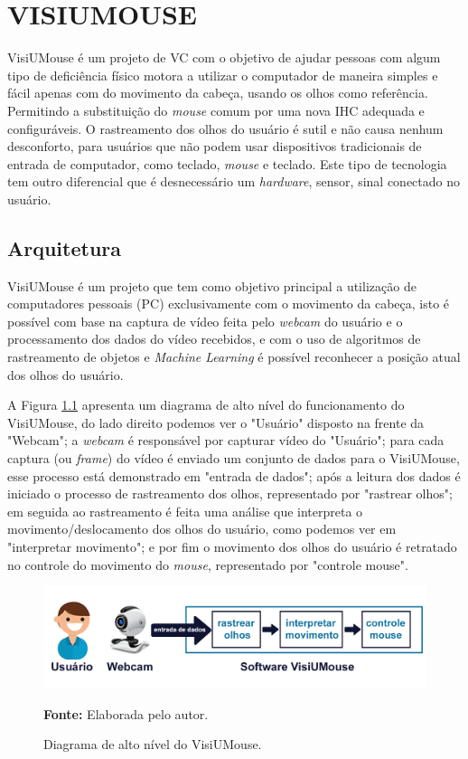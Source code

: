 \chapter{VISIUMOUSE}\label{CAP4}
VisiUMouse é um projeto de VC com o objetivo de ajudar pessoas com algum tipo de deficiência físico motora a utilizar o computador de maneira simples e fácil apenas com do movimento da cabeça, usando os olhos como referência. Permitindo a substituição do \textit{mouse} comum por uma nova IHC adequada e configuráveis. O rastreamento dos olhos do usuário é sutil e não causa nenhum desconforto, para usuários que não podem usar dispositivos tradicionais de entrada de computador, como teclado, \textit{mouse} e teclado. Este tipo de tecnologia tem outro diferencial que é desnecessário um \textit{hardware}, sensor, sinal conectado no usuário.

\section{Arquitetura}\label{Sub:funcionamento-visiumouse}
VisiUMouse é um projeto que tem como objetivo principal a utilização de computadores pessoais (PC) exclusivamente com o movimento da cabeça, isto é possível com base na captura de vídeo feita pelo \textit{webcam} do usuário e o processamento dos dados do vídeo recebidos, e com o uso de algoritmos de rastreamento de objetos e \textit{Machine Learning} é possível reconhecer a posição atual dos olhos do usuário. 

A Figura \ref{fig:projeto-diagrama-alto-nivel} apresenta um diagrama de alto nível do funcionamento do VisiUMouse, do lado direito podemos ver o "Usuário" disposto na frente da "Webcam"; a \textit{webcam} é responsável por capturar vídeo do "Usuário"; para cada captura (ou \textit{frame}) do vídeo é enviado um conjunto de dados para o VisiUMouse, esse processo está demonstrado em "entrada de dados";  após a leitura dos dados é iniciado o processo de rastreamento dos olhos, representado por "rastrear olhos"; em seguida ao rastreamento é feita uma análise que interpreta o movimento/deslocamento dos olhos do usuário, como podemos ver em "interpretar movimento"; e por fim o movimento dos olhos do usuário é retratado no controle do movimento do \textit{mouse}, representado por "controle mouse".

\begin{figure}[htbp]
\centering
\caption{Diagrama de alto nível do VisiUMouse.}
\includegraphics[scale=.25]{img/projeto-diagrama-alto-nivel.png}

{\fontsize{11}{11}\selectfont \textbf{Fonte:} Elaborada pelo autor.}
\label{fig:projeto-diagrama-alto-nivel}
\end{figure}

